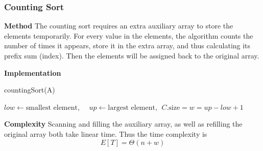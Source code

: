 \documentclass[11pt]{article}
\begin{document}
\subsubsection{Counting Sort}
\noindent \textbf{Method}
The counting sort requires an extra auxiliary array to store the elements temporarily. For every value in the elements, the algorithm counts the number of times it appears, store it in the extra array, and thus calculating its prefix sum (index). Then the elements will be assigned back to the original array. \par \noindent
\textbf{Implementation} \clearpage
\begin{algorithm}
    \caption{countingSort(A)}
    \label{coutSort}
    \begin{algorithmic}
        \REQUIRE $low \gets \text{smallest element}$,~~ $up \gets \text{largest element},~~C.\text{size} = w = up - low + 1$ 
        \ENDFOR
        \ENDFOR
        \ENDWHILE
        \ENDFOR
    \end{algorithmic}
\end{algorithm} \par \noindent
\textbf{Complexity} Scanning and filling the auxiliary array, as well as refilling the original array both take linear time. Thus the time complexity is
\begin{equation}
    E[T] = \Theta(n+w)
\end{equation}
\end{document}
